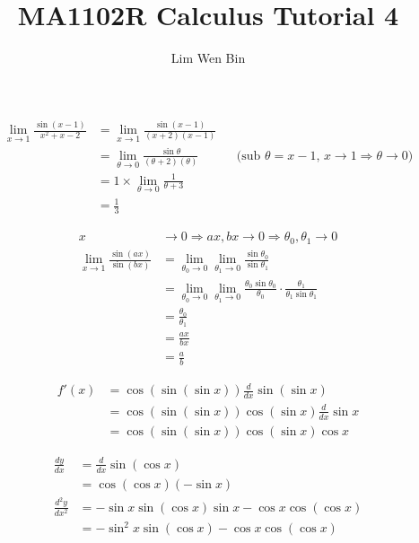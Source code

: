 \documentclass[12pt]{article}
\newenvironment{problem}[2][Problem]{\begin{trivlist}
\item[\hskip \labelsep {\bfseries #1}\hskip \labelsep {\bfseries #2.}]}{\end{trivlist}}
\begin{document}
\title{MA1102R Calculus Tutorial 4}
\author{Lim Wen Bin}
\maketitle
 
\begin{problem}{1.a}
\end{problem}
\begin{align*}
\lim_{x \to 1}\frac{\sin(x-1)}{x^2 + x - 2} &= \lim_{x \to 1}\frac{\sin (x-1)}{(x+2)(x-1)} \\
&= \lim_{\theta \to 0}\frac{\sin \theta}{(\theta+2)(\theta)} && \text{(sub $\theta = x - 1$, $x \to 1 \Rightarrow \theta \to 0$)}\\
&= 1 \times \lim_{\theta \to 0}\frac{1}{\theta + 3}\\
&= \frac{1}{3}
\end{align*}

\begin{problem}{1.b}
\end{problem}
\begin{align*}
 x &\to 0 \Rightarrow ax, bx \to 0 \Rightarrow \theta_0, \theta_1 \to 0 \\ 
\lim_{x \to 1}\frac{\sin(ax)}{\sin(bx)} &= \lim_{\theta_0 \to 0}\lim_{\theta_1 \to 0}\frac{\sin \theta_0}{\sin \theta_1}\\
&= \lim_{\theta_0 \to 0}\lim_{\theta_1 \to 0}\frac{\theta_0 \sin \theta_0}{\theta_0}\cdot \frac{\theta_1}{\theta_1 \sin \theta_1} \\
&= \frac{\theta_0}{\theta_1} \\
&= \frac{ax}{bx} \\
&= \frac{a}{b}
\end{align*}

\begin{problem}{2.c}
\end{problem}
\begin{align*}
f'(x) &= \cos (\sin (\sin x)) \frac{d}{dx} \sin (\sin x) \\
&= \cos (\sin (\sin x))\cos (\sin x) \frac{d}{dx} \sin x \\
&= \cos (\sin (\sin x))\cos (\sin x) \cos x
\end{align*}

\begin{problem}{3}
\end{problem}
\begin{align*}
\frac{dy}{dx} &= \frac{d}{dx} \sin (\cos x) \\
&= \cos (\cos x) (-\sin x) \\
\frac{d^2 y}{d x^2} &= -\sin x \sin (\cos x) \sin x - \cos x \cos (\cos x) \\
&= -\sin^2 x \sin (\cos x) - \cos x \cos (\cos x)
\end{align*}
\end{document}
